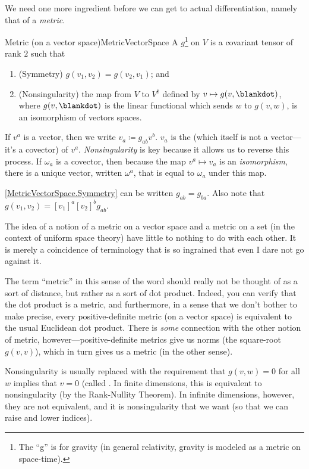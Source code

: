 We need one more ingredient before we can get to actual differentiation, namely that of a \emph{metric}.
\begin{dfn}{Metric (on a vector space)}{MetricVectorSpace}
A  $g$\footnote{The ``g'' is for gravity (in general relativity, gravity is modeled as a metric on space-time).} on $V$ is a covariant tensor of rank $2$ such that
\begin{enumerate}
\item \label{MetricVectorSpace.Symmetry}(Symmetry) $g(v_1,v_2)=g(v_2,v_1)$; and
\item \label{MetricVectorSpace.Nonsingularity}(Nonsingularity) the map from $V$ to $V^{\dagger}$ defined by $v\mapsto g(v,\blankdot )$, where $g(v,\blankdot )$ is the linear functional which sends $w$ to $g(v,w)$, is an isomorphism of vectors spaces.
\end{enumerate}
\begin{rmk}
If $v^a$ is a vector, then we write $v_a\coloneqq g_{ab}v^b$.  $v_a$ is the  (which itself is not a vector---it's a covector) of $v^a$.  \emph{Nonsingularity} is key because it allows us to reverse this process.  If $\omega _a$ is a covector, then because the map $v^a\mapsto v_a$ is an \emph{isomorphism}, there is a unique vector, written $\omega ^a$, that is equal to $\omega _a$ under this map.
\end{rmk}
\begin{rmk}
\cref{MetricVectorSpace.Symmetry} can be written $g_{ab}=g_{ba}$.  Also note that $g(v_1,v_2)=[v_1]^a[v_2]^bg_{ab}$.
\end{rmk}
\begin{rmk}
The idea of a notion of a metric on a vector space and a metric on a set (in the context of uniform space theory) have little to nothing to do with each other.  It is merely a coincidence of terminology that is so ingrained that even I dare not go against it.
\end{rmk}
\begin{rmk}
The term ``metric'' in this sense of the word should really not be thought of as a sort of distance, but rather as a sort of dot product.  Indeed, you can verify that the dot product is a metric, and furthermore, in a sense that we don't bother to make precise, every positive-definite metric (on a vector space) is equivalent to the usual Euclidean dot product.  There is \emph{some} connection with the other notion of metric, however---positive-definite metrics give us norms (the square-root $g(v,v)$), which in turn gives us a metric (in the other sense).
\end{rmk}
\begin{rmk}
Nonsingularity is usually replaced with the requirement that $g(v,w)=0$ for all $w$ implies that $v=0$ (called .  In finite dimensions, this is equivalent to nonsingularity (by the Rank-Nullity Theorem).  In infinite dimensions, however, they are not equivalent, and it is nonsingularity that we want (so that we can raise and lower indices).
\end{rmk}
\end{dfn}
